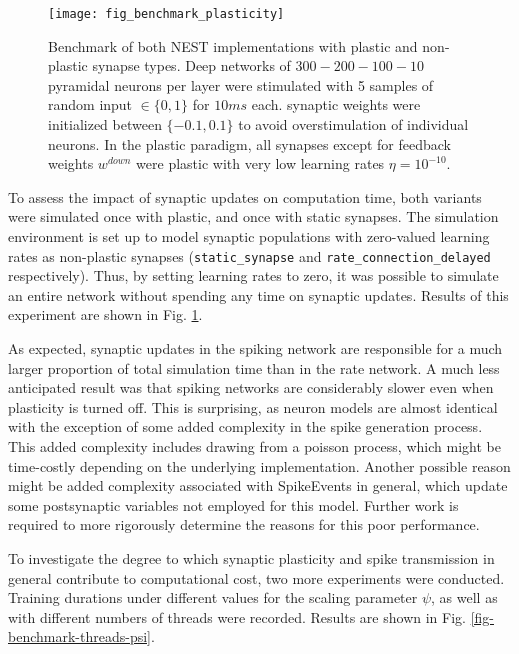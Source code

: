 \begin{figure}[h]
    \centering
    \texttt{[image: fig\_benchmark\_plasticity]}
    \caption[Benchmark of both NEST implementations with plastic and non-plastic synapse types]{Benchmark of both NEST
        implementations with plastic and non-plastic synapse types. Deep networks of $300-200-100-10$ pyramidal neurons
        per layer were stimulated with 5 samples of random input $\in\{0,1\}$ for $10ms$ each. synaptic weights were
        initialized between $\{-0.1, 0.1 \}$ to avoid overstimulation of individual neurons. In the plastic paradigm,
        all synapses except for feedback weights $w^{down}$ were plastic with very low learning rates $\eta =
            10^{-10}$.}
    \label{fig-benchmark-plasticity}
\end{figure}


To assess the impact of synaptic updates on computation time, both variants were simulated once with plastic, and once
with static synapses. The simulation environment is set up to model synaptic populations with zero-valued learning rates
as non-plastic synapses (\texttt{static\_synapse} and \texttt{rate\_connection\_delayed} respectively). Thus, by setting
learning rates to zero, it was possible to simulate an entire network without spending any time on synaptic updates.
Results of this experiment are shown in Fig. \ref{fig-benchmark-plasticity}.

As expected, synaptic updates in the spiking network are responsible for a much larger proportion of total simulation
time than in the rate network. A much less anticipated result was that spiking networks are considerably slower even
when plasticity is turned off. This is surprising, as neuron models are almost identical with the exception of some
added complexity in the spike generation process. This added complexity includes drawing from a poisson process, which
might be time-costly depending on the underlying implementation. Another possible reason might be added complexity
associated with SpikeEvents in general, which update some postsynaptic variables not employed for this model. Further
work is required to more rigorously determine the reasons for this poor performance.\newline

\noindent To investigate the degree to which synaptic plasticity and spike transmission in general contribute to
computational cost, two more experiments were conducted. Training durations under different values for the scaling
parameter $\psi$, as well as with different numbers of threads were recorded. Results are shown in Fig.
\ref{fig-benchmark-threads-psi}.

